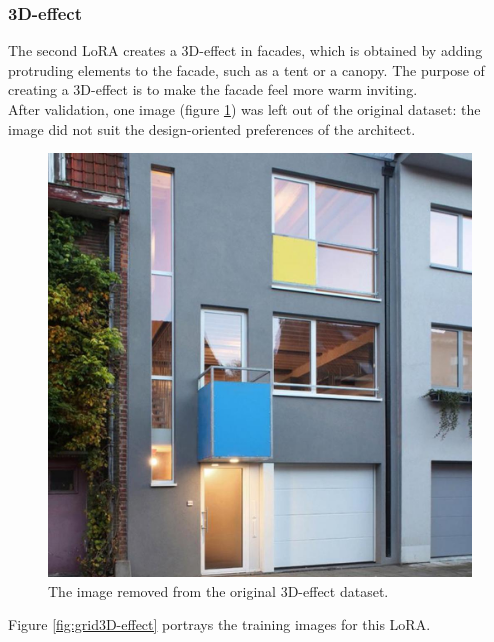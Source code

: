 \subsubsection{3D-effect}
The second LoRA creates a 3D-effect in facades, which is obtained by adding protruding elements to the facade, such as a tent or a canopy. The purpose of creating a 3D-effect is to make the facade feel more warm inviting.\\
After validation, one image (figure \ref{fig:3deffectomittedimage}) was left out of the original dataset: the image did not suit the design-oriented preferences of the architect.
\begin{figure}[H]
    \centering
    \includegraphics[width=0.24\linewidth]{Images//LoRAs//3D-effect/4.jpg}
    \caption{The image removed from the original 3D-effect dataset.}
    \label{fig:3deffectomittedimage}
\end{figure}
Figure \ref{fig:grid3D-effect} portrays the training images for this LoRA.

